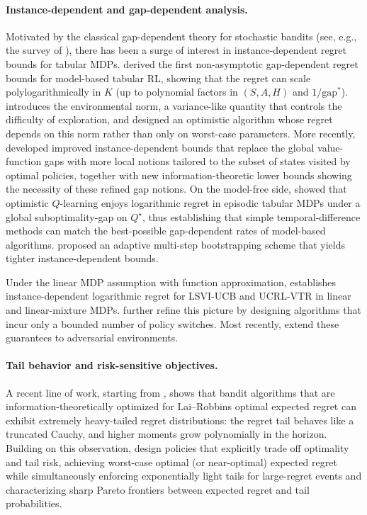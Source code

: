 \documentclass[11pt]{article}
\newcommand{\gapstar}{\mathrm{gap}^*}
\begin{document}
\paragraph{Instance-dependent and gap-dependent analysis.}
Motivated by the classical gap-dependent theory for stochastic bandits (see, e.g., the survey of \citet{bubeck2012regret}), there has been a surge of interest in instance-dependent regret bounds for tabular MDPs.  
\citet{simchowitz2019non} derived the first non-asymptotic gap-dependent regret bounds for model-based tabular RL, showing that the regret can scale polylogarithmically in $K$ (up to polynomial factors in $(S,A,H)$ and $1/\gapstar$).  
\citet{zanette2019tighter} introduces the environmental norm, a variance-like quantity that controls the difficulty of exploration, and designed an optimistic algorithm whose regret depends on this norm rather than only on worst-case parameters.  
More recently, \citet{dann2021beyond} developed improved instance-dependent bounds that replace the global value-function gaps with more local notions tailored to the subset of states visited by optimal policies, together with new information-theoretic lower bounds showing the necessity of these refined gap notions. On the model-free side, \citet{yang2021q} showed that optimistic $Q$-learning enjoys logarithmic regret in episodic tabular MDPs under a global suboptimality-gap on $Q^\star$, thus establishing that simple temporal-difference methods can match the best-possible gap-dependent rates of model-based algorithms. \citet{xu2021fine} proposed an adaptive multi-step bootstrapping scheme that yields tighter instance-dependent bounds.

Under the linear MDP assumption with function approximation, \citet{he2021logarithmic} establishes instance-dependent logarithmic regret for LSVI-UCB and UCRL-VTR in linear and linear-mixture MDPs. \citet{velegkas2022reinforcement} further refine this picture by designing algorithms that incur only a bounded number of policy switches. Most recently, \citet{zhao2025logarithmic} extend these guarantees to adversarial environments.

\paragraph{Tail behavior and risk-sensitive objectives.}
A recent line of work, starting from \citet{fan2024fragility}, shows that bandit algorithms that are information-theoretically optimized for Lai--Robbins optimal expected regret can exhibit extremely heavy-tailed regret distributions: the regret tail behaves like a truncated Cauchy, and higher moments grow polynomially in the horizon. Building on this observation, \citet{simchi2022simple,simchi2023stochastic} design policies that explicitly trade off optimality and tail risk, achieving worst-case optimal (or near-optimal) expected regret while simultaneously enforcing exponentially light tails for large-regret events and characterizing sharp Pareto frontiers between expected regret and tail probabilities.
\end{document}
